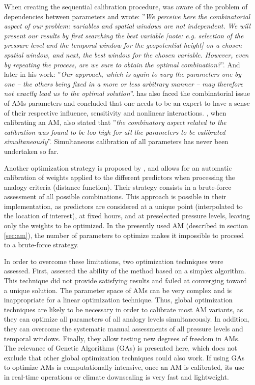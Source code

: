 \documentclass{ametsoc}
\begin{document}
When creating the sequential calibration procedure, \citet{Bontron2004} was aware of the problem of dependencies between parameters and wrote: ''\textit{We perceive here the combinatorial aspect of our problem: variables and spatial windows are not independent. We will present our results by first searching the best variable [note: e.g. selection of the pressure level and the temporal window for the geopotential height] on a chosen spatial window, and next, the best window for the chosen variable. However, even by repeating the process, are we sure to obtain the optimal combination?}''. And later in his work: ''\textit{Our approach, which is again to vary the parameters one by one -- the others being fixed in a more or less arbitrary manner -- may therefore not exactly lead us to the optimal solution}''. \citet{Bliefernicht2010} has also faced the combinatorial issue of AMs parameters and concluded that one needs to be an expert to have a sense of their respective influence, sensitivity and nonlinear interactions. \citet{BenDaoud2010}, when calibrating an AM, also stated that ''\textit{the combinatory aspect related to the calibration was found to be too high for all the parameters to be calibrated simultaneously}''. Simultaneous calibration of all parameters has never been undertaken so far. 

Another optimization strategy is proposed by \citet{Junk2015}, and allows for an automatic calibration of weights applied to the different predictors when processing the analogy criteria (distance function). Their strategy consists in a brute-force assessment of all possible combinations. This approach is possible in their implementation, as predictors are considered at a unique point (interpolated to the location of interest), at fixed hours, and at preselected pressure levels, leaving only the weights to be optimized. In the presently used AM (described in section \ref{sec:am}), the number of parameters to optimize makes it impossible to proceed to a brute-force strategy.

In order to overcome these limitations, two optimization techniques were assessed. First, \citet{Horton2012a} assessed the ability of the \citet{Nelder1965a} method based on a simplex algorithm. This technique did not provide satisfying results and failed at converging toward a unique solution. The parameter space of AMs can be very complex and is inappropriate for a linear optimization technique. Thus, global optimization techniques are likely to be necessary in order to calibrate most AM variants, as they can optimize all parameters of all analogy levels simultaneously. In addition, they can overcome the systematic manual assessments of all pressure levels and temporal windows. Finally, they allow testing new degrees of freedom in AMs. The relevance of Genetic Algorithms (GAs) is presented here, which does not exclude that other global optimization techniques could also work. If using GAs to optimize AMs is computationally intensive, once an AM is calibrated, its use in real-time operations or climate downscaling is very fast and lightweight.
\end{document}
